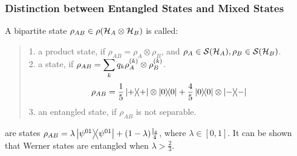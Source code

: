 \subsubsection{Distinction between Entangled States and Mixed States}
A bipartite state $\rho_{AB} \in \rho(\mathcal{H}_A \otimes \mathcal{H}_B)$ is called:
\begin{quote}
    1. a product state, if $\rho_{AB} = \rho_A \otimes \rho_B$, and $\rho_A \in \mathcal{S}(\mathcal{H}_A), \rho_B \in \mathcal{S}(\mathcal{H}_B)$. \\
    2. a  state, if $\displaystyle \rho_{AB} = \sum_{k} q_k \rho_A^{(k)} \otimes \rho_B^{(k)}$.
    $$\rho_{AB} = \frac{1}{5} \dyad{+}\otimes\dyad{0} + \frac{4}{5}\dyad{0}\otimes\dyad{-}$$
    3. an entangled state, if $\rho_{AB}$ is not separable.
\end{quote}
\begin{definition}
     are states $\rho_{AB} = \lambda \dyad{\psi^{01}} + (1-\lambda)\frac{\id_4}{4}$, where $\lambda \in [0,1]$. It can be shown that Werner states are entangled when $\lambda > \frac{2}{3}$.
\end{definition}


